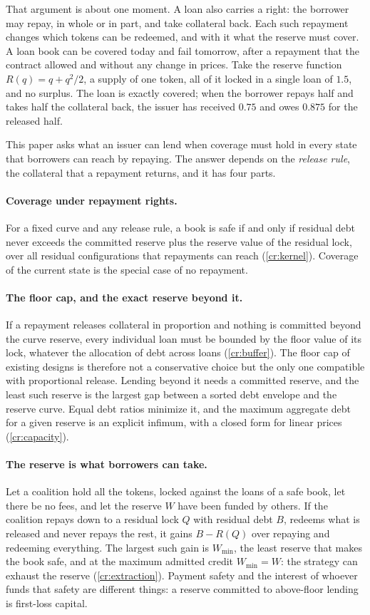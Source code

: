 \documentclass[11pt,a4paper]{article}
\theoremstyle{plain}
\theoremstyle{definition}
\theoremstyle{remark}
\begin{document}
That argument is about one moment. A loan also carries a right: the borrower may repay, in whole or in part, and take collateral back. Each such repayment changes which tokens can be redeemed, and with it what the reserve must cover. A loan book can be covered today and fail tomorrow, after a repayment that the contract allowed and without any change in prices. Take the reserve function $R(q)=q+q^2/2$, a supply of one token, all of it locked in a single loan of $1.5$, and no surplus. The loan is exactly covered; when the borrower repays half and takes half the collateral back, the issuer has received $0.75$ and owes $0.875$ for the released half.

This paper asks what an issuer can lend when coverage must hold in every state that borrowers can reach by repaying. The answer depends on the \emph{release rule}, the collateral that a repayment returns, and it has four parts.

\paragraph{Coverage under repayment rights.} For a fixed curve and any release rule, a book is safe if and only if residual debt never exceeds the committed reserve plus the reserve value of the residual lock, over all residual configurations that repayments can reach (\cref{cr:kernel}). Coverage of the current state is the special case of no repayment.

\paragraph{The floor cap, and the exact reserve beyond it.} If a repayment releases collateral in proportion and nothing is committed beyond the curve reserve, every individual loan must be bounded by the floor value of its lock, whatever the allocation of debt across loans (\cref{cr:buffer}). The floor cap of existing designs is therefore not a conservative choice but the only one compatible with proportional release. Lending beyond it needs a committed reserve, and the least such reserve is the largest gap between a sorted debt envelope and the reserve curve. Equal debt ratios minimize it, and the maximum aggregate debt for a given reserve is an explicit infimum, with a closed form for linear prices (\cref{cr:capacity}).

\paragraph{The reserve is what borrowers can take.} Let a coalition hold all the tokens, locked against the loans of a safe book, let there be no fees, and let the reserve $W$ have been funded by others. If the coalition repays down to a residual lock $Q$ with residual debt $B$, redeems what is released and never repays the rest, it gains $B-R(Q)$ over repaying and redeeming everything. The largest such gain is $W_{\min}$, the least reserve that makes the book safe, and at the maximum admitted credit $W_{\min}=W$: the strategy can exhaust the reserve (\cref{cr:extraction}). Payment safety and the interest of whoever funds that safety are different things: a reserve committed to above-floor lending is first-loss capital.
\end{document}
